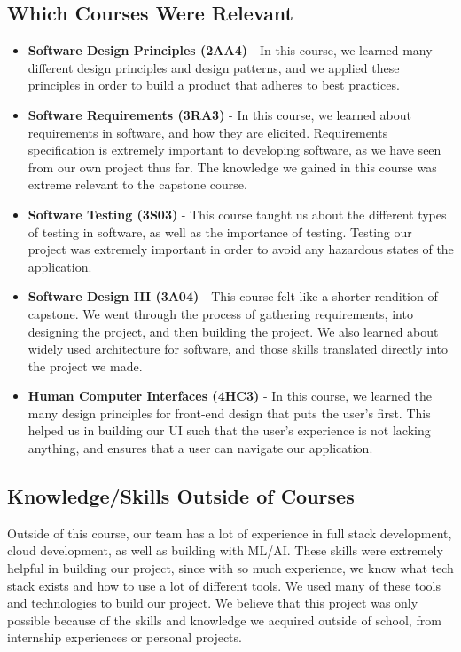 \documentclass{article}
\begin{document}
\subsection{Which Courses Were Relevant}
\begin{itemize}
    \item \textbf{Software Design Principles (2AA4)} - In this course, we
    learned many different design principles and design patterns, and we applied
    these principles in order to build a product that adheres to best practices.
    \item \textbf{Software Requirements (3RA3)} - In this course, we learned
    about requirements in software, and how they are elicited. Requirements
    specification is extremely important to developing software, as we have seen
    from our own project thus far. The knowledge we gained in this course was
    extreme relevant to the capstone course.
    \item \textbf{Software Testing (3S03)} - This course taught us about the
    different types of testing in software, as well as the importance of
    testing. Testing our project was extremely important in order to avoid any
    hazardous states of the application.
    \item \textbf{Software Design III (3A04)} - This course felt like a shorter
    rendition of capstone. We went through the process of gathering
    requirements, into designing the project, and then building the project. We
    also learned about widely used architecture for software, and those skills
    translated directly into the project we made.
    \item \textbf{Human Computer Interfaces (4HC3)} - In this course, we learned
    the many design principles for front-end design that puts the user's first.
    This helped us in building our UI such that the user's experience is not
    lacking anything, and ensures that a user can navigate our application.
\end{itemize}



\subsection{Knowledge/Skills Outside of Courses}
Outside of this course, our team has a lot of experience in full stack
development, cloud development, as well as building with ML/AI. These skills
were extremely helpful in building our project, since with so much experience,
we know what tech stack exists and how to use a lot of different tools. We used
many of these tools and technologies to build our project. We believe that this
project was only possible because of the skills and knowledge we acquired
outside of school, from internship experiences or personal projects. 
\end{document}
